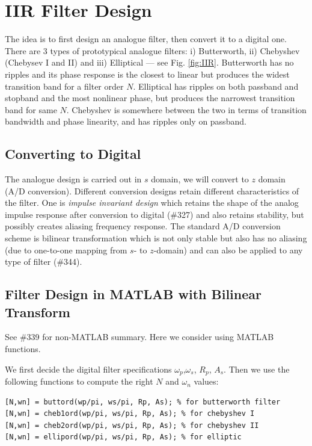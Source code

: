\documentclass{article}
\begin{document}
\clearpage
\section{IIR Filter Design}
The idea is to first design an analogue filter, then convert it to a digital one. There are 3 types of prototypical analogue filters: i) Butterworth, ii) Chebyshev (Chebysev I and II) and iii) Elliptical \---- see Fig. \ref{fig:IIR}. Butterworth has no ripples and its phase response is the closest to linear but produces the widest transition band for a filter order $N$. Elliptical has ripples on both passband and stopband and the most nonlinear phase, but produces the narrowest transition band for same $N$. Chebyshev is somewhere between the two in terms of transition bandwidth and phase linearity, and has ripples only on passband. 

\subsection{Converting to Digital} The analogue design is carried out in $s$ domain, we will convert to $z$ domain (A/D conversion). Different conversion designs retain different characteristics of the filter. One is \textit{impulse invariant design} which retains the shape of the analog impulse response after conversion to digital (\#327) and also retains stability, but possibly creates aliasing frequency response. The standard A/D conversion scheme is bilinear transformation which is not only stable but also has no aliasing (due to one-to-one mapping from $s$- to $z$-domain) and can also be applied to any type of filter (\#344).

\subsection{Filter Design in MATLAB with Bilinear Transform}
See \#339 for non-MATLAB summary. Here we consider using MATLAB functions.

We first decide the digital filter specifications $\omega_p$,$\omega_s$, $R_p$, $A_s$. %
Then we use the following functions to compute the right $N$ and $\omega_n$ values:
\begin{verbatim}
[N,wn] = buttord(wp/pi, ws/pi, Rp, As); % for butterworth filter
[N,wn] = cheb1ord(wp/pi, ws/pi, Rp, As); % for chebyshev I
[N,wn] = cheb2ord(wp/pi, ws/pi, Rp, As); % for chebyshev II
[N,wn] = ellipord(wp/pi, ws/pi, Rp, As); % for elliptic
\end{verbatim}
\end{document}
